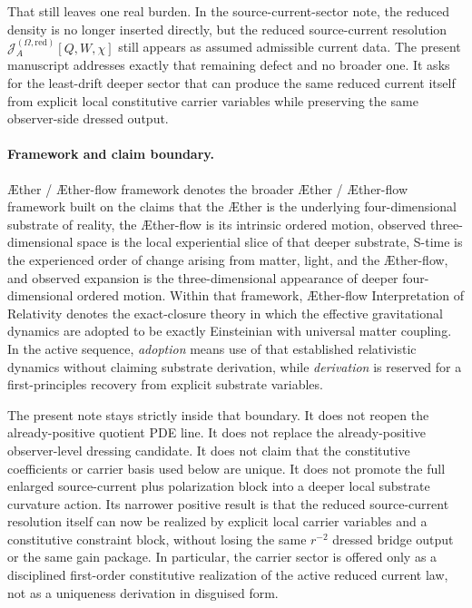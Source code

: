 \documentclass[11pt]{article}
\newcommand{\Aether}{\AE{}ther}
\newcommand{\Aflow}{\AE{}ther-flow}
\newcommand{\TheoryName}{\Aflow{} Interpretation of Relativity}
\newcommand{\TheoryProgram}{\Aether{} / \Aflow{} framework}
\newcommand{\SourceCurrentRed}{\mathcal J^{(\Omega,\mathrm{red})}}
\begin{document}
That still leaves one real burden. In the source-current-sector note, the reduced density is no longer inserted directly, but the reduced source-current resolution \(\SourceCurrentRed_A[Q,W,\chi]\) still appears as assumed admissible current data. The present manuscript addresses exactly that remaining defect and no broader one. It asks for the least-drift deeper sector that can produce the same reduced current itself from explicit local constitutive carrier variables while preserving the same observer-side dressed output.

\paragraph{Framework and claim boundary.}
\TheoryProgram{} denotes the broader \Aether{} / \Aflow{} framework built on the claims that the \Aether{} is the underlying four-dimensional substrate of reality, the \Aflow{} is its intrinsic ordered motion, observed three-dimensional space is the local experiential slice of that deeper substrate, S-time is the experienced order of change arising from matter, light, and the \Aflow{}, and observed expansion is the three-dimensional appearance of deeper four-dimensional ordered motion. Within that framework, \TheoryName{} denotes the exact-closure theory in which the effective gravitational dynamics are adopted to be exactly Einsteinian with universal matter coupling. In the active sequence, \emph{adoption} means use of that established relativistic dynamics without claiming substrate derivation, while \emph{derivation} is reserved for a first-principles recovery from explicit substrate variables.

The present note stays strictly inside that boundary. It does not reopen the already-positive quotient PDE line. It does not replace the already-positive observer-level dressing candidate. It does not claim that the constitutive coefficients or carrier basis used below are unique. It does not promote the full enlarged source-current plus polarization block into a deeper local substrate curvature action. Its narrower positive result is that the reduced source-current resolution itself can now be realized by explicit local carrier variables and a constitutive constraint block, without losing the same \(r^{-2}\) dressed bridge output or the same gain package. In particular, the carrier sector is offered only as a disciplined first-order constitutive realization of the active reduced current law, not as a uniqueness derivation in disguised form.
\end{document}
